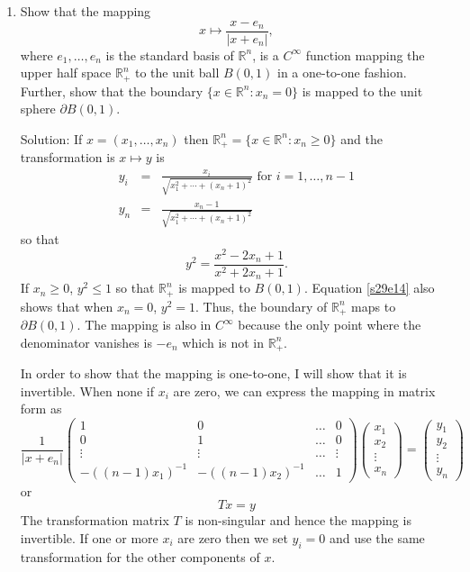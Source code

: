 \documentclass{article}
\theoremstyle{plain}
\numberwithin{thm}{section}
\theoremstyle{plain}
\numberwithin{prop}{section}
\theoremstyle{definition}
\numberwithin{defn}{section}
\theoremstyle{remark}
\numberwithin{equation}{section}
\begin{document}
\begin{enumerate}
\item Show that the mapping
\[
x \mapsto \frac{x - e_n}{|x + e_n|},
\]
where $e_1, \ldots, e_n$ is the standard basis of $\mathbb{R}^n$, is a $C^\infty$ function mapping the upper half
space $\mathbb{R}^n_+$ to the unit ball $B(0, 1)$ in a one-to-one fashion. Further, show that the boundary
$\{x \in \mathbb{R}^n: x_n = 0\}$ is mapped to the unit sphere $\partial B(0, 1)$.

Solution: If $x = (x_1, \ldots, x_n)$ then $\mathbb{R}^n_+ = \{x \in \mathbb{R}^n : x_n \ge 0\}$ and the 
transformation is $x \mapsto y$ is
\begin{eqnarray*}
y_i &=& \frac{x_i}{\sqrt{x_1^2 + \cdots + (x_n + 1)^2}} \text{ for } i = 1, \ldots, n - 1 \\
y_n &=& \frac{x_n - 1}{\sqrt{x_1^2 + \cdots + (x_n + 1)^2}}  
\end{eqnarray*}
so that
\begin{equation}\label{s29e14}
y^2 = \frac{x^2 - 2x_n + 1}{x^2 + 2x_n + 1}.
\end{equation}
If $x_n \ge 0$, $y^2 \le 1$ so that $\mathbb{R}^n_+$ is mapped to $B(0, 1)$. Equation \eqref{s29e14} also shows 
that when $x_n = 0$, $y^2 = 1$. Thus, the boundary of $\mathbb{R}^n_+$ maps to $\partial B(0, 1)$. The mapping is
also in $C^\infty$ because the only point where the denominator vanishes is $-e_n$ which is not in 
$\mathbb{R}^n_+$.

In order to show that the mapping is one-to-one, I will show that it is invertible. When none if $x_i$ are
zero, we can express the mapping in matrix form as
\[
\frac{1}{|x + e_n|}\begin{pmatrix}
1 & 0 & \ldots & 0 \\
0 & 1 & \ldots & 0 \\
\vdots & \vdots & \ldots & \vdots \\
-((n-1)x_1)^{-1} & -((n-1)x_2)^{-1} & \ldots &1 
\end{pmatrix}\begin{pmatrix}
x_1 \\
x_2 \\
\vdots \\
x_n
\end{pmatrix} = \begin{pmatrix}
y_1 \\
y_2 \\
\vdots \\
y_n
\end{pmatrix}
\]
or
\[
Tx = y
\]
The transformation matrix $T$ is non-singular and hence the mapping is invertible. If one or more $x_i$ are zero 
then we set $y_i = 0$ and use the same transformation for the other components of $x$. 


\end{enumerate}
\end{document}
